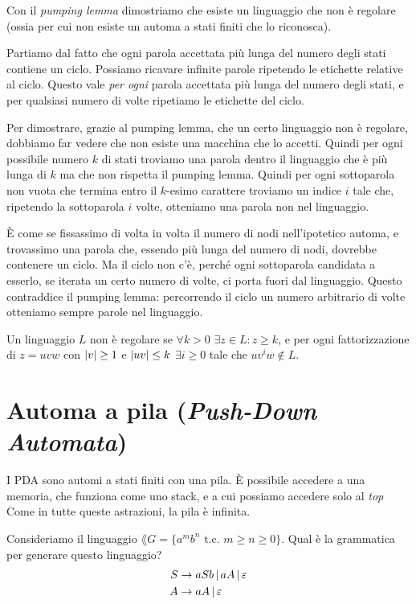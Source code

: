 Con il \emph{pumping lemma} dimostriamo che esiste un linguaggio che non \`e regolare (ossia per cui non esiste un automa a stati finiti che lo riconosca).

Partiamo dal fatto che ogni parola accettata pi\`u lunga del numero degli stati contiene un ciclo. 
Possiamo ricavare infinite parole ripetendo le etichette relative al ciclo.
Questo vale \emph{per ogni} parola accettata pi\`u lunga del numero degli stati, e per qualsiasi numero di volte ripetiamo le etichette del ciclo.

Per dimostrare, grazie al pumping lemma, che un certo linguaggio non \`e regolare, dobbiamo far vedere che non esiste una macchina che lo accetti.
Quindi per ogni possibile numero $k$ di stati troviamo una parola dentro il linguaggio che \`e pi\`u lunga di $k$ ma che non rispetta il pumping lemma.
Quindi per ogni sottoparola non vuota che termina entro il $k$-esimo carattere troviamo un indice $i$ tale che, ripetendo la sottoparola $i$ volte, otteniamo una parola non nel linguaggio.

\`E come se fissassimo di volta in volta il numero di nodi nell'ipotetico automa, e trovassimo una parola che, essendo pi\`u lunga del numero di nodi, dovrebbe contenere un ciclo.
Ma il ciclo non c'\`e, perch\'e ogni sottoparola candidata a esserlo, se iterata un certo numero di volte, ci porta fuori dal linguaggio.
Questo contraddice il pumping lemma: percorrendo il ciclo un numero arbitrario di volte otteniamo sempre parole nel linguaggio.

\begin{theorem}
	Un linguaggio $L$ non \`e regolare se $\forall k > 0$ $\exists z \in L : z \ge k$, e per ogni fattorizzazione di $z = u v w$ con $\left\lvert{v}\right\rvert \ge 1$ e $\left\lvert{uv}\right\rvert \le k$ $\exists i \ge 0$ tale che $u v^i w \notin L$.
\end{theorem}

\section{Automa a pila (\emph{Push-Down Automata})}

I PDA sono automi a stati finiti con una pila.
\`E possibile accedere a una memoria, che funziona come uno stack, e a cui possiamo accedere solo al \emph{top}
Come in tutte queste astrazioni, la pila \`e infinita.



Consideriamo il linguaggio $\lang{G} = \{ a^m b^n \text{ t.c. } m \ge n \ge 0 \}$.
Qual \`e la grammatica per generare questo linguaggio?
\begin{align*}
	S &\to aSb \, | \, aA \, | \, \varepsilon \\
	A &\to aA \, | \, \varepsilon
\end{align*}

